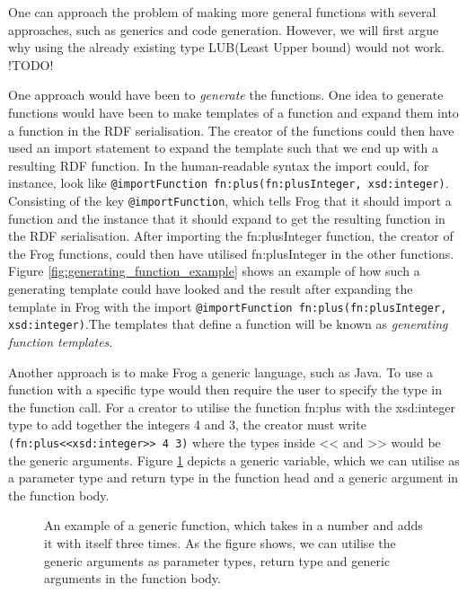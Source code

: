 \para
One can approach the problem of making more general functions with several approaches, such as generics and code generation. However, we will first argue why using the already existing type LUB(Least Upper bound) would not work. !TODO!

\para
One approach would have been to \emph{generate} the functions. One idea to generate functions would have been to make templates of a function and expand them into a function in the RDF serialisation. The creator of the functions could then have used an import statement to expand the template such that we end up with a resulting RDF function. In the human-readable syntax the import could, for instance, look like \lstinline{@importFunction fn:plus(fn:plusInteger, xsd:integer)}. Consisting of the key \lstinline{@importFunction}, which tells Frog that it should import a function and the instance that it should expand to get the resulting function in the RDF serialisation. After importing the fn:plusInteger function, the creator of the Frog functions, could then have utilised fn:plusInteger in the other functions. Figure \ref{fig:generating_function_example} shows an example of how such a generating template could have looked and the result after expanding the template in Frog with the import \lstinline{@importFunction fn:plus(fn:plusInteger, xsd:integer)}.The templates that define a function will be known as \emph{generating function templates}.

\para  
Another approach is to make Frog a generic language, such as Java. To use a function with a specific type would then require the user to specify the type in the function call. For a creator to utilise the function fn:plus with the xsd:integer type to add together the integers 4 and 3, the creator must write \lstinline{(fn:plus<<xsd:integer>> 4 3)} where the types inside << and >> would be the generic arguments. Figure \ref{fig:generic_function} depicts a generic variable, which we can utilise as a parameter type and return type in the function head and a generic argument in the function body.  

\begin{figure}
    \centering
    
    \caption{An example of a generic function, which takes in a number and adds it with itself three times. As the figure shows, we can utilise the generic arguments as parameter types, return type and generic arguments in the function body. }
    \label{fig:generic_function}
\end{figure}

